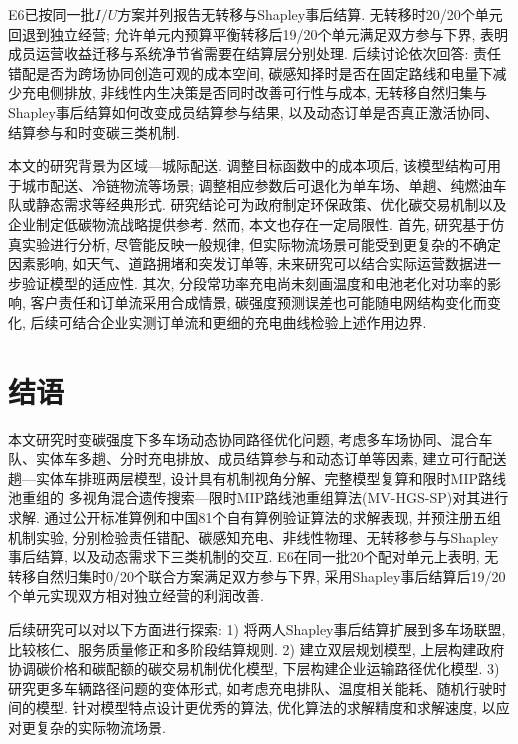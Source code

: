 \documentclass{setp-new}
\begin{document}
E6已按同一批$I/U$方案并列报告无转移与Shapley事后结算.
无转移时20/20个单元回退到独立经营;
允许单元内预算平衡转移后19/20个单元满足双方参与下界,
表明成员运营收益迁移与系统净节省需要在结算层分别处理.
后续讨论依次回答:
责任错配是否为跨场协同创造可观的成本空间,
碳感知择时是否在固定路线和电量下减少充电侧排放,
非线性内生决策是否同时改善可行性与成本,
无转移自然归集与Shapley事后结算如何改变成员结算参与结果,
以及动态订单是否真正激活协同、结算参与和时变碳三类机制.

本文的研究背景为区域—城际配送. 调整目标函数中的成本项后, 该模型结构可用于城市配送、冷链物流等场景;
调整相应参数后可退化为单车场、单趟、纯燃油车队或静态需求等经典形式.
研究结论可为政府制定环保政策、优化碳交易机制以及企业制定低碳物流战略提供参考.
然而, 本文也存在一定局限性.
首先, 研究基于仿真实验进行分析, 尽管能反映一般规律,
但实际物流场景可能受到更复杂的不确定因素影响,
如天气、道路拥堵和突发订单等,
未来研究可以结合实际运营数据进一步验证模型的适应性.
其次, 分段常功率充电尚未刻画温度和电池老化对功率的影响,
客户责任和订单流采用合成情景,
碳强度预测误差也可能随电网结构变化而变化,
后续可结合企业实测订单流和更细的充电曲线检验上述作用边界.

\section{结语}

本文研究时变碳强度下多车场动态协同路径优化问题,
考虑多车场协同、混合车队、实体车多趟、分时充电排放、成员结算参与和动态订单等因素,
建立可行配送趟—实体车排班两层模型,
设计具有机制视角分解、完整模型复算和限时MIP路线池重组的
多视角混合遗传搜索—限时MIP路线池重组算法(MV-HGS-SP)对其进行求解.
通过公开标准算例和中国81个自有算例验证算法的求解表现,
并预注册五组机制实验,
分别检验责任错配、碳感知充电、非线性物理、无转移参与与Shapley事后结算, 以及动态需求下三类机制的交互.
E6在同一批20个配对单元上表明, 无转移自然归集时0/20个联合方案满足双方参与下界,
采用Shapley事后结算后19/20个单元实现双方相对独立经营的利润改善.

后续研究可以对以下方面进行探索:
1) 将两人Shapley事后结算扩展到多车场联盟,
比较核仁、服务质量修正和多阶段结算规则.
2) 建立双层规划模型,
上层构建政府协调碳价格和碳配额的碳交易机制优化模型,
下层构建企业运输路径优化模型.
3) 研究更多车辆路径问题的变体形式,
如考虑充电排队、温度相关能耗、随机行驶时间的模型.
针对模型特点设计更优秀的算法,
优化算法的求解精度和求解速度, 以应对更复杂的实际物流场景.

\end{document}
